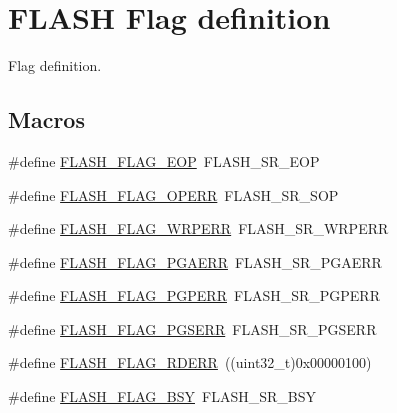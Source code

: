 \hypertarget{group___f_l_a_s_h___flag__definition}{}\section{F\+L\+A\+SH Flag definition}
\label{group___f_l_a_s_h___flag__definition}


Flag definition.  


\subsection*{Macros}
\begin{DoxyCompactItemize}
\item 
\#define \hyperlink{group___f_l_a_s_h___flag__definition_gaf043ba4d8f837350bfc7754a99fae5a9}{F\+L\+A\+S\+H\+\_\+\+F\+L\+A\+G\+\_\+\+E\+OP}~F\+L\+A\+S\+H\+\_\+\+S\+R\+\_\+\+E\+OP
\item 
\#define \hyperlink{group___f_l_a_s_h___flag__definition_gad8a96ceda91fcf0d1299da933b5816f1}{F\+L\+A\+S\+H\+\_\+\+F\+L\+A\+G\+\_\+\+O\+P\+E\+RR}~F\+L\+A\+S\+H\+\_\+\+S\+R\+\_\+\+S\+OP
\item 
\#define \hyperlink{group___f_l_a_s_h___flag__definition_ga6abf64f916992585899369166db3f266}{F\+L\+A\+S\+H\+\_\+\+F\+L\+A\+G\+\_\+\+W\+R\+P\+E\+RR}~F\+L\+A\+S\+H\+\_\+\+S\+R\+\_\+\+W\+R\+P\+E\+RR
\item 
\#define \hyperlink{group___f_l_a_s_h___flag__definition_ga2c3f4dbea065f8ea2987eada4dab30bd}{F\+L\+A\+S\+H\+\_\+\+F\+L\+A\+G\+\_\+\+P\+G\+A\+E\+RR}~F\+L\+A\+S\+H\+\_\+\+S\+R\+\_\+\+P\+G\+A\+E\+RR
\item 
\#define \hyperlink{group___f_l_a_s_h___flag__definition_ga88a93907641f5eeb4091a26b84c94897}{F\+L\+A\+S\+H\+\_\+\+F\+L\+A\+G\+\_\+\+P\+G\+P\+E\+RR}~F\+L\+A\+S\+H\+\_\+\+S\+R\+\_\+\+P\+G\+P\+E\+RR
\item 
\#define \hyperlink{group___f_l_a_s_h___flag__definition_ga25b80c716320e667162846da8be09b68}{F\+L\+A\+S\+H\+\_\+\+F\+L\+A\+G\+\_\+\+P\+G\+S\+E\+RR}~F\+L\+A\+S\+H\+\_\+\+S\+R\+\_\+\+P\+G\+S\+E\+RR
\item 
\#define \hyperlink{group___f_l_a_s_h___flag__definition_ga0d1faec4c7bcca54d543ff3cd8983d3b}{F\+L\+A\+S\+H\+\_\+\+F\+L\+A\+G\+\_\+\+R\+D\+E\+RR}~((uint32\+\_\+t)0x00000100)
\item 
\#define \hyperlink{group___f_l_a_s_h___flag__definition_gad3bc368f954ad7744deda3315da2fff7}{F\+L\+A\+S\+H\+\_\+\+F\+L\+A\+G\+\_\+\+B\+SY}~F\+L\+A\+S\+H\+\_\+\+S\+R\+\_\+\+B\+SY
\end{DoxyCompactItemize}


